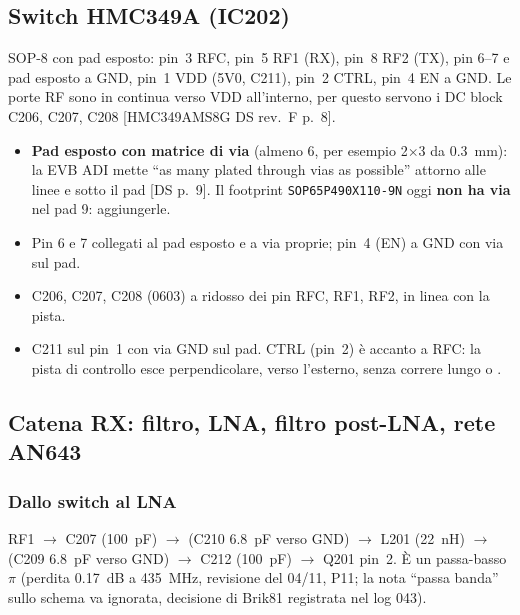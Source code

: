 \documentclass[a4paper,10pt]{article}
\newcommand{\net}[1]{\texttt{\detokenize{#1}}}
\newcommand{\fonte}[1]{{\footnotesize\color{sbgray}[#1]}}
\newcounter{regola}
\begin{document}
\subsection{Switch HMC349A (IC202)}
\label{sec:sw}
SOP-8 con pad esposto: pin~3 RFC, pin~5 RF1 (RX), pin~8 RF2 (TX), pin 6--7 e pad esposto a GND, pin~1
VDD (5V0, C211), pin~2 CTRL, pin~4 EN a GND. Le porte RF sono in continua verso VDD all'interno, per
questo servono i DC block C206, C207, C208 \fonte{HMC349AMS8G DS rev.~F p.~8}.

\begin{regola}[IC202]
\begin{itemize}
\item \textbf{Pad esposto con matrice di via} (almeno 6, per esempio 2$\times$3 da \SI{0.3}{mm}): la EVB ADI
      mette \enquote{as many plated through vias as possible} attorno alle linee e sotto il pad
      \fonte{DS p.~9}. Il footprint \texttt{SOP65P490X110-9N} oggi \textbf{non ha via} nel pad 9:
      aggiungerle.
\item Pin 6 e 7 collegati al pad esposto e a via proprie; pin~4 (EN) a GND con via sul pad.
\item C206, C207, C208 (0603) a ridosso dei pin RFC, RF1, RF2, in linea con la pista.
\item C211 sul pin~1 con via GND sul pad. CTRL (pin~2) è accanto a RFC: la pista di controllo esce
      perpendicolare, verso l'esterno, senza correre lungo \net{RF_ANT} o \net{RF_SW_COM}.
\end{itemize}
\end{regola}

\subsection{Catena RX: filtro, LNA, filtro post-LNA, rete AN643}
\label{sec:rx}

\subsubsection{Dallo switch al LNA}
RF1 $\rightarrow$ C207 (\SI{100}{pF}) $\rightarrow$ \net{RF_RX_F1} (C210 \SI{6.8}{pF} verso GND)
$\rightarrow$ L201 (\SI{22}{nH}) $\rightarrow$ \net{RF_RX_F2} (C209 \SI{6.8}{pF} verso GND)
$\rightarrow$ C212 (\SI{100}{pF}) $\rightarrow$ Q201 pin~2. È un passa-basso $\pi$ (perdita \SI{0.17}{dB} a
\SI{435}{MHz}, revisione del 04/11, P11; la nota \enquote{passa banda} sullo schema va ignorata, decisione
di Brik81 registrata nel log 043).
\end{document}
